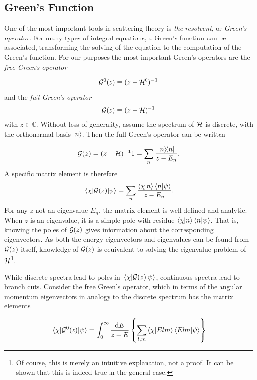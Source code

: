 \subsection{Green's Function}
One of the most important tools in scattering theory is \textit{the resolvent},
or \textit{Green's operator}. For many types of integral equations, a Green's
function can be associated, transforming the solving of the equation to the
computation of the Green's function. For our purposes the most important Green's
operators are the \textit{free Green's operator}

\begin{equation*}
  \mathcal{G}^{0}(z) \equiv (z-\mathcal{H}^{0})^{-1}
\end{equation*}
and the \textit{full Green's operator}
\begin{equation*}
  \mathcal{G}(z) \equiv (z-\mathcal{H})^{-1}
\end{equation*}
with \(z\in\mathbb{C}\). Without loss of generality, assume the spectrum of
\(\mathcal{H}\) is discrete, with the orthonormal basis \({\ket{n}}\). Then the full
Green's operator can be written

\begin{equation*}
  \mathcal{G}(z) = (z-\mathcal{H})^{-1}1 = \sum_{n}\frac{\op{n}}{z-E_{n}}.
\end{equation*}
A specific matrix element is therefore
\begin{equation*}
  \mel{\chi}{\oop{G}(z)}{\psi} =\sum_{n} \frac{\ip{\chi}{n}\ip{n}{\psi}}{z-E_{n}}.
\end{equation*}
\newcommand{\gop}{\oop{G}(z)}
\newcommand{\mgop}{\(\oop{G}(z)\)}
For any \(z\) not an eigenvalue \(E_{n}\), the matrix element is well defined and
analytic. When \(z\) is an eigenvalue, it is a simple pole with residue
\(\ip{\chi}{n}\ip{n}{\psi}\). That is, knowing the poles of \(\mathcal{G}(z)\) gives
information about the corresponding eigenvectors. As both the energy
eigenvectors and eigenvalues can be found from \mgop{} itself, knowledge of
\mgop{} is equivalent to solving the eigenvalue problem of
\(\mathcal{H}\)\footnote{Of course, this is merely an intuitive explanation, not a
  proof. It can be shown that this is indeed true in the general case.}.

While discrete spectra lead to poles in \(\mel{\chi}{\gop{}}{\psi}\), continuous spectra lead to 
branch cuts. Consider the free Green's operator, which in terms of the angular
momentum eigenvectors in analogy to the discrete spectrum has the matrix elements

\begin{equation*}
  \mel{\chi}{\oop{G}^{0}(z)}{\psi} = \int_{0}^{\infty}\frac{\dd E}{z-E}\left\{
  \sum_{l,m}\ip{\chi}{Elm}\ip{Elm}{\psi}
  \right\}
\end{equation*}

